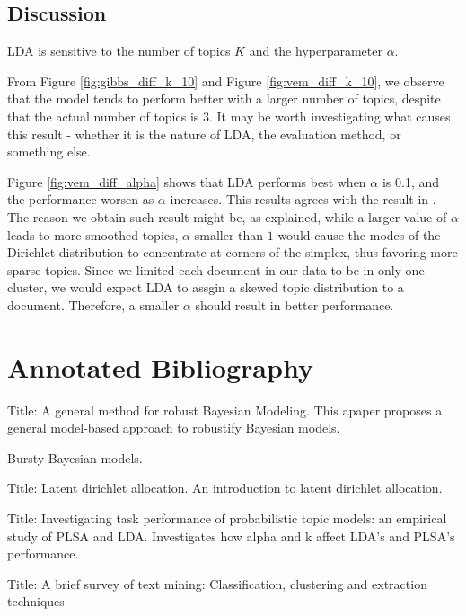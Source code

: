\documentclass{article}
\begin{document}
\subsection{Discussion}

LDA is sensitive to the number of topics $K$ and the hyperparameter $\alpha$.

From Figure \ref{fig:gibbs_diff_k_10} and Figure \ref{fig:vem_diff_k_10}, we observe that the model tends to perform better with a larger number of topics, despite that the actual number of topics is 3. It may be worth investigating what causes this result - whether it is the nature of LDA, the evaluation method, or something else.

Figure \ref{fig:vem_diff_alpha} shows that LDA performs best when $\alpha$ is 0.1, and the performance worsen as $\alpha$ increases. This results agrees with the result in \cite{lu2011investigating}. The reason we obtain such result might be, as \cite{lu2011investigating} explained, while a larger value of $\alpha$ leads to more smoothed topics, $\alpha$ smaller than $1$ would cause the modes of the Dirichlet distribution to concentrate at corners of the simplex, thus favoring more sparse topics. Since we limited each document in our data to be in only one cluster, we would expect LDA to assgin a skewed topic distribution to a document. Therefore, a smaller $\alpha$ should result in better performance.







\section{Annotated Bibliography}
\cite{wang2018general}
Title: A general method for robust Bayesian Modeling.
This apaper proposes a general model-based approach to robustify Bayesian models.

\cite{doyle2009accounting}
Bursty Bayesian models.

\cite{blei2003latent}
Title: Latent dirichlet allocation.
An introduction to latent dirichlet allocation.

\cite{lu2011investigating}
Title: Investigating task performance of probabilistic topic models: an empirical study of PLSA and LDA. Investigates how alpha and k affect LDA's and PLSA's performance.

\cite{allahyari2017brief}
Title: A brief survey of text mining: Classification, clustering and extraction techniques
\end{document}
